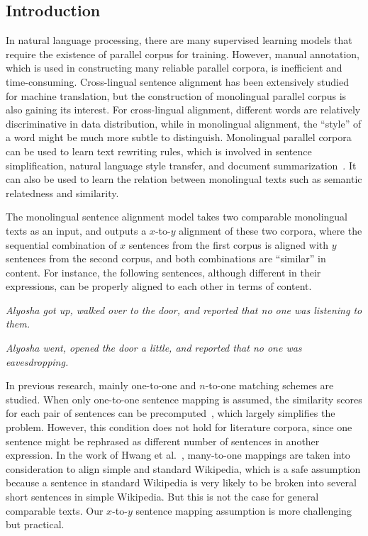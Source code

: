 \documentclass[runningheads]{llncs}
\begin{document}
\begin{spacing}{1.1}
\section{Introduction}
\label{sec:intro}

In natural language processing, there are many supervised learning models that require the existence of parallel corpus for training. However, manual annotation, which is used in constructing many reliable parallel corpora, is inefficient and time-consuming. Cross-lingual sentence alignment has been extensively studied for machine translation, but the construction of monolingual parallel corpus is also gaining its interest. For cross-lingual alignment, different words are relatively discriminative in data distribution, while in monolingual alignment, the ``style'' of a word might be much more subtle to distinguish. Monolingual parallel corpora can be used to learn text rewriting rules, which is involved in sentence simplification, natural language style transfer, and document summarization~\cite{hwang2015aligning}. It can also be used to learn the relation between monolingual texts such as semantic relatedness and similarity.

The monolingual sentence alignment model takes two comparable monolingual texts as an input, and outputs a $x$-to-$y$ alignment of these two corpora, where the sequential combination of $x$ sentences from the first corpus is aligned with $y$ sentences from the second corpus, and both combinations are ``similar'' in content. For instance, the following sentences, although different in their expressions, can be properly aligned to each other in terms of content.

\emph{Alyosha got up, walked over to the door, and reported that no one was listening to them.}

\emph{Alyosha went, opened the door a little, and reported that no one was eavesdropping.}

In previous research, mainly one-to-one and $n$-to-one matching schemes are studied. When only one-to-one sentence mapping is assumed, the similarity scores for each pair of sentences can be precomputed~\cite{kajiwara2016building}, which largely simplifies the problem. However, this condition does not hold for literature corpora, since one sentence might be rephrased as different number of sentences in another expression. In the work of Hwang et al.~\cite{hwang2015aligning}, many-to-one mappings are taken into consideration to align simple and standard Wikipedia, which is a safe assumption because a sentence in standard Wikipedia is very likely to be broken into several short sentences in simple Wikipedia. But this is not the case for general comparable texts. Our $x$-to-$y$ sentence mapping assumption is more challenging but practical.


\end{spacing}
\end{document}
